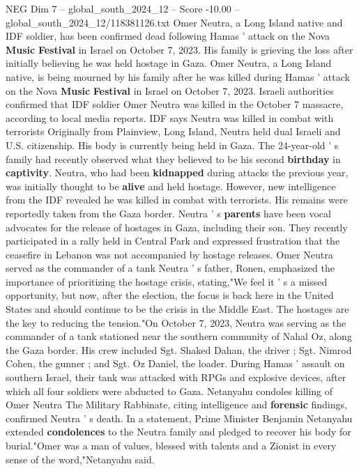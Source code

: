 \begin{textsample}{NEG Dim 7 – global\_south\_2024\_12 – Score -10.00 – global\_south\_2024\_12/118381126.txt}  \label{ex:f7_neg_291}
Omer Neutra, a Long Island native and IDF soldier, has been confirmed dead following Hamas ' attack on the Nova \textbf{Music} \textbf{Festival} in Israel on October 7, 2023.
His family is grieving the loss after initially believing he was held hostage in Gaza.
Omer Neutra, a Long Island native, is being mourned by his family after he was killed during Hamas ' attack on the Nova \textbf{Music} \textbf{Festival} in Israel on October 7, 2023.
Israeli authorities confirmed that IDF soldier Omer Neutra was killed in the October 7 massacre, according to local media reports.
IDF says Neutra was killed in combat with terrorists Originally from Plainview, Long Island, Neutra held dual Israeli and U.S. citizenship.
His body is currently being held in Gaza.
The 24-year-old ' s family had recently observed what they believed to be his second \textbf{birthday} in \textbf{captivity}.
Neutra, who had been \textbf{kidnapped} during attacks the previous year, was initially thought to be \textbf{alive} and held hostage.
However, new intelligence from the IDF revealed he was killed in combat with terrorists.
His remains were reportedly taken from the Gaza border.
Neutra ' s \textbf{parents} have been vocal advocates for the release of hostages in Gaza, including their son.
They recently participated in a rally held in Central Park and expressed frustration that the ceasefire in Lebanon was not accompanied by hostage releases.
Omer Neutra served as the commander of a tank Neutra ' s father, Ronen, emphasized the importance of prioritizing the hostage crisis, stating,"We feel it ' s a missed opportunity, but now, after the election, the focus is back here in the United States and should continue to be the crisis in the Middle East.
The hostages are the key to reducing the tension."On October 7, 2023, Neutra was serving as the commander of a tank stationed near the southern community of Nahal Oz, along the Gaza border.
His crew included Sgt.
Shaked Dahan, the driver ; Sgt.
Nimrod Cohen, the gunner ; and Sgt.
Oz Daniel, the loader.
During Hamas ' assault on southern Israel, their tank was attacked with RPGs and explosive devices, after which all four soldiers were abducted to Gaza.
Netanyahu condoles killing of Omer Neutra The Military Rabbinate, citing intelligence and \textbf{forensic} findings, confirmed Neutra ' s death.
In a statement, Prime Minister Benjamin Netanyahu extended \textbf{condolences} to the Neutra family and pledged to recover his body for burial."Omer was a man of values, blessed with talents and a Zionist in every sense of the word,"Netanyahu said.

\end{textsample}
